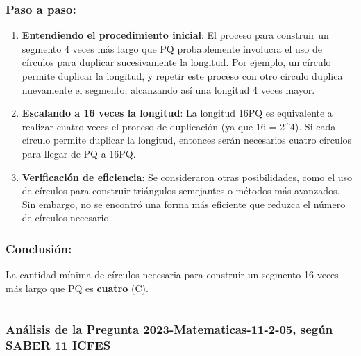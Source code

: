 \documentclass[
]{article}
\begin{document}
\subsubsection{Paso a paso:}\label{paso-a-paso}

\begin{enumerate}
\def\labelenumi{\arabic{enumi}.}
\item
  \textbf{Entendiendo el procedimiento inicial}: El proceso para
  construir un segmento 4 veces más largo que PQ probablemente involucra
  el uso de círculos para duplicar sucesivamente la longitud. Por
  ejemplo, un círculo permite duplicar la longitud, y repetir este
  proceso con otro círculo duplica nuevamente el segmento, alcanzando
  así una longitud 4 veces mayor.
\item
  \textbf{Escalando a 16 veces la longitud}: La longitud 16PQ es
  equivalente a realizar cuatro veces el proceso de duplicación (ya que
  16 = 2\^{}4). Si cada círculo permite duplicar la longitud, entonces
  serán necesarios cuatro círculos para llegar de PQ a 16PQ.
\item
  \textbf{Verificación de eficiencia}: Se consideraron otras
  posibilidades, como el uso de círculos para construir triángulos
  semejantes o métodos más avanzados. Sin embargo, no se encontró una
  forma más eficiente que reduzca el número de círculos necesario.
\end{enumerate}

\subsubsection{Conclusión:}\label{conclusiuxf3n-3}

La cantidad mínima de círculos necesaria para construir un segmento 16
veces más largo que PQ es \textbf{cuatro} (C).

\begin{center}\rule{0.5\linewidth}{0.5pt}\end{center}

\subsubsection{Análisis de la Pregunta 2023-Matematicas-11-2-05, según
SABER 11
ICFES}\label{anuxe1lisis-de-la-pregunta-2023-matematicas-11-2-05-seguxfan-saber-11-icfes}
\end{document}
